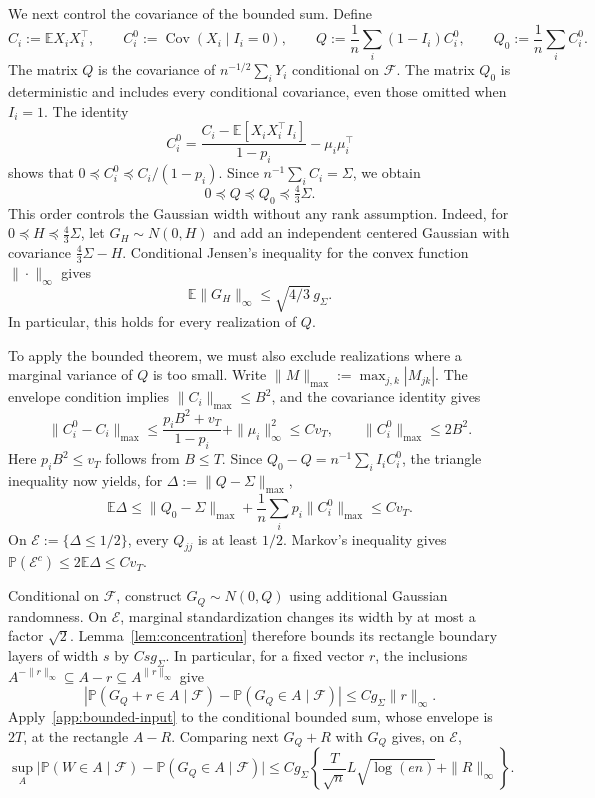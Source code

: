 \documentclass[11pt,letterpaper]{article}
\theoremstyle{remark}
\newcommand{\E}{\mathbb E}
\newcommand{\Pp}{\mathbb P}
\newcommand{\Cov}{\operatorname{Cov}}
\newcommand{\maxnorm}[1]{\lVert#1\rVert_{\max}}
\begin{document}
We next control the covariance of the bounded sum. Define
\[
 C_i:=\E X_iX_i^\top,\qquad C_i^0:=\Cov(X_i\mid I_i=0),
 \qquad
 Q:=\frac1n\sum_i(1-I_i)C_i^0,\qquad
 Q_0:=\frac1n\sum_iC_i^0.
\]
The matrix $Q$ is the covariance of $n^{-1/2}\sum_iY_i$
conditional on $\mathcal F$. The matrix $Q_0$ is deterministic
and includes every conditional covariance, even those omitted
when $I_i=1$. The identity
\[
 C_i^0=\frac{C_i-\E[X_iX_i^\top I_i]}{1-p_i}
                   -\mu_i\mu_i^\top
\]
shows that $0\preceq C_i^0\preceq C_i/(1-p_i)$.
Since $n^{-1}\sum_iC_i=\Sigma$, we obtain
\begin{equation}
 0\preceq Q\preceq Q_0\preceq\tfrac43\Sigma.
 \label{app:conditional-width-order}
\end{equation}
This order controls the Gaussian width without any rank assumption.
Indeed, for $0\preceq H\preceq\tfrac43\Sigma$, let
$G_H\sim N(0,H)$ and add an independent centered Gaussian with
covariance $\tfrac43\Sigma-H$. Conditional Jensen's inequality
for the convex function $\|\cdot\|_\infty$ gives
\[
 \E\|G_H\|_\infty\le\sqrt{4/3}\,g_\Sigma.
\]
In particular, this holds for every realization of $Q$.

To apply the bounded theorem, we must also exclude realizations
where a marginal variance of $Q$ is too small. Write
$\maxnorm M:=\max_{j,k}|M_{jk}|$. The envelope condition implies
$\maxnorm{C_i}\le B^2$, and the covariance identity gives
\[
 \maxnorm{C_i^0-C_i}
 \le\frac{p_iB^2+v_T}{1-p_i}+\|\mu_i\|_\infty^2
 \le Cv_T,
 \qquad \maxnorm{C_i^0}\le2B^2.
\]
Here $p_iB^2\le v_T$ follows from $B\le T$.
Since $Q_0-Q=n^{-1}\sum_iI_iC_i^0$, the triangle inequality
now yields, for $\Delta:=\maxnorm{Q-\Sigma}$,
\begin{equation}
 \E\Delta\le\maxnorm{Q_0-\Sigma}
             +\frac1n\sum_i p_i\maxnorm{C_i^0}\le Cv_T.
 \label{app:conditional-covariance}
\end{equation}
On $\mathcal E:=\{\Delta\le1/2\}$, every $Q_{jj}$ is at
least $1/2$. Markov's inequality gives
$\Pp(\mathcal E^c)\le2\E\Delta\le Cv_T$.

Conditional on $\mathcal F$, construct $G_Q\sim N(0,Q)$ using
additional Gaussian randomness. On $\mathcal E$, marginal
standardization changes its width by at most a factor $\sqrt2$.
Lemma~\ref{lem:concentration} therefore bounds its rectangle
boundary layers of width $s$ by $Csg_\Sigma$. In particular,
for a fixed vector $r$, the inclusions
$A^{-\|r\|_\infty}\subseteq A-r\subseteq A^{\|r\|_\infty}$
give
\[
 |\Pp(G_Q+r\in A\mid\mathcal F)
        -\Pp(G_Q\in A\mid\mathcal F)|
 \le Cg_\Sigma\|r\|_\infty.
\]
Apply~\eqref{app:bounded-input} to the conditional bounded sum,
whose envelope is $2T$, at the rectangle $A-R$. Comparing next
$G_Q+R$ with $G_Q$ gives, on $\mathcal E$,
\[
 \sup_A\bigl|\Pp(W\in A\mid\mathcal F)
             -\Pp(G_Q\in A\mid\mathcal F)\bigr|
 \le Cg_\Sigma\left\{
       \frac{T}{\sqrt n}L\sqrt{\log(en)}+\|R\|_\infty\right\}.
\]
\end{document}
